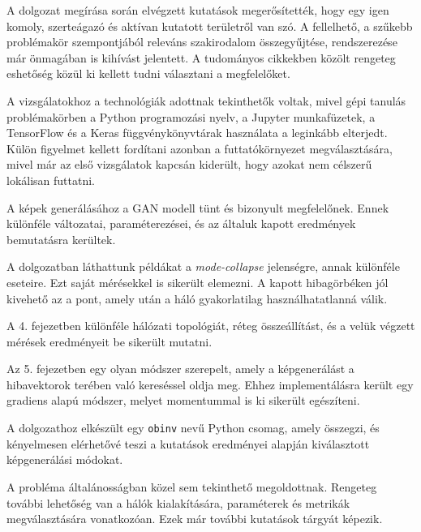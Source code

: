 
A dolgozat megírása során elvégzett kutatások megerősítették, hogy egy igen komoly, szerteágazó és aktívan kutatott területről van szó. A fellelhető, a szűkebb problémakör szempontjából releváns szakirodalom összegyűjtése, rendszerezése már önmagában is kihívást jelentett. A tudományos cikkekben közölt rengeteg eshetőség közül ki kellett tudni választani a megfelelőket.

A vizsgálatokhoz a technológiák adottnak tekinthetők voltak, mivel gépi tanulás problémakörben a Python programozási nyelv, a Jupyter munkafüzetek, a TensorFlow és a Keras függvénykönyvtárak használata a leginkább elterjedt. Külön figyelmet kellett fordítani azonban a futtatókörnyezet megválasztására, mivel már az első vizsgálatok kapcsán kiderült, hogy azokat nem célszerű lokálisan futtatni.

A képek generálásához a GAN modell tünt és bizonyult megfelelőnek. Ennek különféle változatai, paraméterezései, és az általuk kapott eredmények bemutatásra kerültek.

A dolgozatban láthattunk példákat a \textit{mode-collapse} jelenségre, annak különféle eseteire. Ezt saját mérésekkel is sikerült elemezni. A kapott hibagörbéken jól kivehető az a pont, amely után a háló gyakorlatilag használhatatlanná válik.

A 4. fejezetben különféle hálózati topológiát, réteg összeállítást, és a velük végzett mérések eredményeit be sikerült mutatni.

Az 5. fejezetben egy olyan módszer szerepelt, amely a képgenerálást a hibavektorok terében való kereséssel oldja meg. Ehhez implementálásra került egy gradiens alapú módszer, melyet momentummal is ki sikerült egészíteni.

A dolgozathoz elkészült egy \texttt{obinv} nevű Python csomag, amely összegzi, és kényelmesen elérhetővé teszi a kutatások eredményei alapján kiválasztott képgenerálási módokat.

A probléma általánosságban közel sem tekinthető megoldottnak. Rengeteg további lehetőség van a hálók kialakítására, paraméterek és metrikák megválasztására vonatkozóan. Ezek már további kutatások tárgyát képezik.
